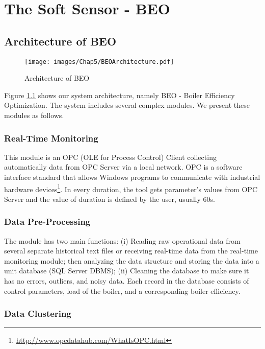 \chapter{The Soft Sensor -  BEO}
\label{chap:appendix1}

\section{Architecture of BEO}

\begin{figure}[H]
  \centering
  \texttt{[image: images/Chap5/BEOArchitecture.pdf]}
  \caption{Architecture of BEO}
  \label{App:fig01}    
\end{figure}

Figure \ref{App:fig01} shows our system architecture, namely BEO - Boiler Efficiency Optimization. The system includes several complex modules. We present these modules as follows.

\subsection{Real-Time Monitoring} 

This module is an OPC (OLE for Process Control) Client collecting automatically data from OPC Server via a local network. OPC is a software interface standard that allows Windows programs to communicate with industrial hardware devices\footnote{\url{http://www.opcdatahub.com/WhatIsOPC.html}}. In every duration, the tool gets parameter's values from OPC Server and the value of duration is defined by the user, usually 60s.

\subsection{Data Pre-Processing} 

The module has two main functions: (i) Reading raw operational data from several separate historical text files or receiving real-time data from the real-time monitoring module; then analyzing the data structure and storing the data into a unit database (SQL Server DBMS); (ii) Cleaning the database to make sure it has no errors, outliers, and noisy data. Each record in the database consists of control parameters, load of the boiler, and a corresponding boiler efficiency.

\subsection{Data Clustering} 

